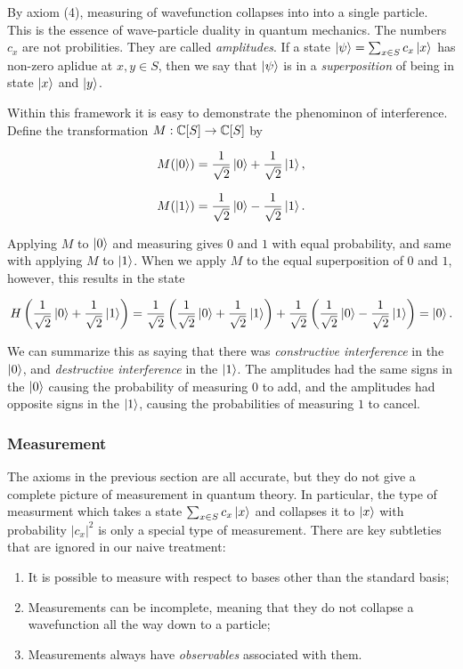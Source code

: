 \documentclass{article}
\theoremstyle{definition}
\numberwithin{figure}{section}
\begin{document}
By axiom (4), measuring of wavefunction collapses into into a single particle. This is the essence of wave-particle duality in quantum mechanics. The numbers $c_x$ are not probilities. They are called \textit{amplitudes}. If a state $\ket{\psi}=\sum_{x\in S}c_x \ket{x}$ has non-zero aplidue at $x,y\in S$, then we say that $\ket{\psi}$ is in a \textit{superposition} of being in state $\ket{x}$ and $\ket{y}$.

Within this framework it is easy to demonstrate the phenominon of interference. Define the transformation $M: \mathbb{C}[S]\to \mathbb{C}[S]$ by

$$M(\left|0\right>)=\frac{1}{\sqrt{2}}\left|0\right>+\frac{1}{\sqrt{2}}\left|1\right>,$$

$$M(\left|1\right>)=\frac{1}{\sqrt{2}}\left|0\right>-\frac{1}{\sqrt{2}}\left|1\right>.$$

Applying $M$ to $\left|0\right>$ and measuring gives $0$ and $1$ with equal probability, and same with applying $M$ to $\left|1\right>$. When we apply $M$ to the equal superposition of $0$ and $1$, however, this results in the state

$$H\left(\frac{1}{\sqrt{2}}\left|0\right>+\frac{1}{\sqrt{2}}\left|1\right>\right)=\frac{1}{\sqrt{2}}\left(\frac{1}{\sqrt{2}}\left|0\right>+\frac{1}{\sqrt{2}}\left|1\right>\right)+\frac{1}{\sqrt{2}}\left(\frac{1}{\sqrt{2}}\left|0\right>-\frac{1}{\sqrt{2}}\left|1\right>\right)=\left|0\right>.$$

We can summarize this as saying that there was \textit{constructive interference} in the $\left|0\right>$, and \textit{destructive interference} in the $\left|1\right>$. The amplitudes had the same signs in the $\left|0\right>$ causing the probability of measuring $0$ to add, and the amplitudes had opposite signs in the $\left|1\right>$, causing the probabilities of measuring $1$ to cancel. 

\subsubsection{Measurement}

The axioms in the previous section are all accurate, but they do not give a complete picture of measurement in quantum theory. In particular, the type of measurment which takes a state $\sum_{x\in S}c_x \ket{x}$ and collapses it to $\ket{x}$ with probability $|c_x|^2$ is only a special type of measurement. There are key subtleties that are ignored in our naive treatment:

\begin{enumerate}
\item It is possible to measure with respect to bases other than the standard basis;
\item Measurements can be incomplete, meaning that they do not collapse a wavefunction all the way down to a particle;
\item Measurements always have \textit{observables} associated with them.
\end{enumerate}
\end{document}
